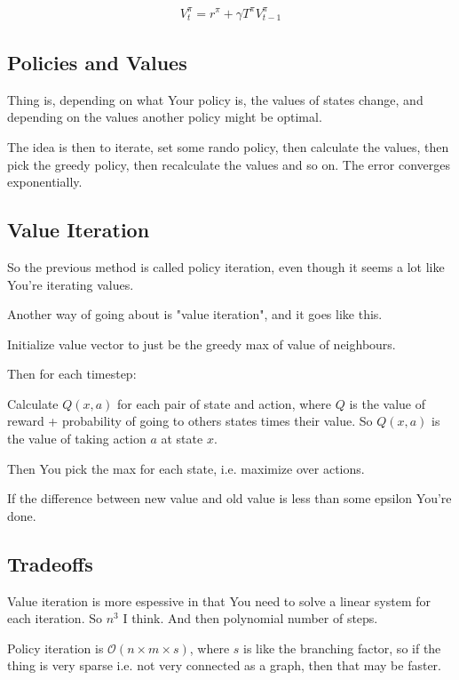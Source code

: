 \documentclass{article}
\begin{document}
		\begin{align}
			V^\pi_t  = r^\pi + \gamma T^\pi V^\pi_{t-1}
		\end{align}
		
		
	\subsection{Policies and Values}
	
		Thing is, depending on what Your policy is, the values of states change, and depending on the values another policy might be optimal.
		
		The idea is then to iterate, set some rando policy, then calculate the values, then pick the greedy policy, then recalculate the values and so on. The error converges exponentially.
		
	\subsection{Value Iteration}
	
		So the previous method is called policy iteration, even though it seems a lot like You're iterating values.
		
		Another way of going about is "value iteration", and it goes like this.
		
		Initialize value vector to just be the greedy max of value of neighbours.
		
		Then for each timestep:
		
		Calculate $Q(x, a)$ for each pair of state and action, where $Q$ is the value of reward + probability of going to others states times their value. So $Q(x, a)$ is the value of taking action $a$ at state $x$.
		
		Then You pick the max for each state, i.e. maximize over actions.
		
		If the difference between new value and old value is less than some epsilon You're done.
		
	\subsection{Tradeoffs}
	
		Value iteration is more espessive in that You need to solve a linear system for each iteration. So $n^3$ I think. And then polynomial number of steps.
		
		Policy iteration is $\mathcal{O}(n\times m\times s)$, where $s$ is like the branching factor, so if the thing is very sparse i.e. not very connected as a graph, then that may be faster.
		
\end{document}
